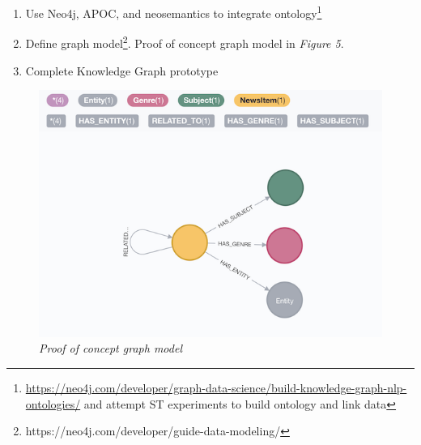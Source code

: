 \documentclass[11pt]{article}
\begin{document}
\begin{enumerate}
\begin{enumerate}
  \item Use Neo4j, APOC, and neosemantics to integrate ontology\footnote{\url{https://neo4j.com/developer/graph-data-science/build-knowledge-graph-nlp-ontologies/} and attempt ST experiments to build ontology and link data}
  \item Define graph model\footnote{https://neo4j.com/developer/guide-data-modeling/}. Proof of concept graph model in \textit{Figure 5}.
  \item Complete Knowledge Graph prototype
  \end{enumerate}

\begin{figure}
\centerline{\includegraphics{graph-model}}
\caption{\textit{Proof of concept graph model}}
\end{figure}


\end{enumerate}
\end{document}
